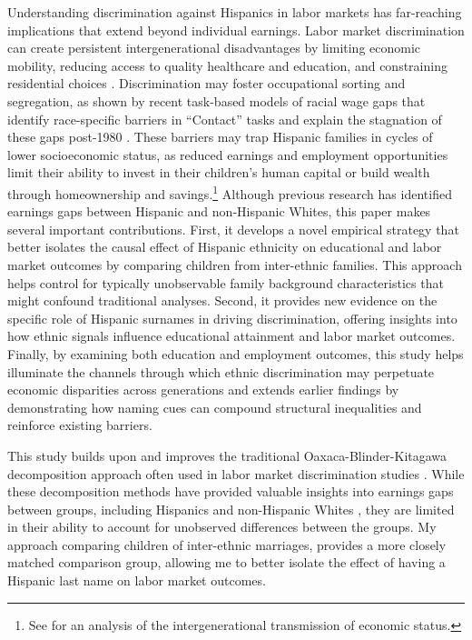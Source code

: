 Understanding discrimination against Hispanics in labor markets has far-reaching implications that extend beyond individual earnings. Labor market discrimination can create persistent intergenerational disadvantages by limiting economic mobility, reducing access to quality healthcare and education, and constraining residential choices \autocite{chettyUnitedStatesStill2014, chettyEffectsExposureBetter2016,chettyFadingAmericanDream2017,bowles2002inheritance, djajic2003assimilation}. Discrimination may foster occupational sorting and segregation, as shown by recent task-based models of racial wage gaps that identify race-specific barriers in “Contact” tasks and explain the stagnation of these gaps post-1980 \autocite{hurst2024task}. These barriers may trap Hispanic families in cycles of lower socioeconomic status, as reduced earnings and employment opportunities limit their ability to invest in their children's human capital or build wealth through homeownership and savings.\footnote{See \textcite{bowles2002inheritance} for an analysis of the intergenerational transmission of economic status.} Although previous research has identified earnings gaps between Hispanic and non-Hispanic Whites, this paper makes several important contributions. First, it develops a novel empirical strategy that better isolates the causal effect of Hispanic ethnicity on educational and labor market outcomes by comparing children from inter-ethnic families. This approach helps control for typically unobservable family background characteristics that might confound traditional analyses. Second, it provides new evidence on the specific role of Hispanic surnames in driving discrimination, offering insights into how ethnic signals influence educational attainment and labor market outcomes. Finally, by examining both education and employment outcomes, this study helps illuminate the channels through which ethnic discrimination may perpetuate economic disparities across generations and extends earlier findings by demonstrating how naming cues can compound structural inequalities and reinforce existing barriers.

This study builds upon and improves the traditional Oaxaca-Blinder-Kitagawa decomposition approach often used in labor market discrimination studies \autocite{kitagawa1955components, oaxaca1973male,blinder1973wage}. While these decomposition methods have provided valuable insights into earnings gaps between groups, including Hispanics and non-Hispanic Whites \autocite{davilaChangesRelativeEarnings2008}, they are limited in their ability to account for unobserved differences between the groups. My approach comparing children of inter-ethnic marriages, provides a more closely matched comparison group, allowing me to better isolate the effect of having a Hispanic last name on labor market outcomes.

